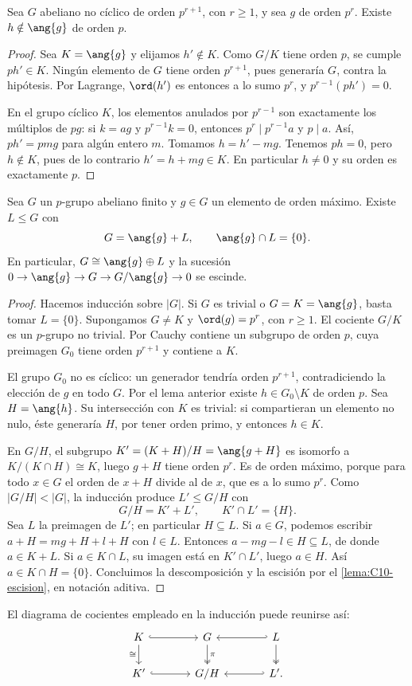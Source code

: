 \begin{lema}\label{lema:C10-auxiliar}
Sea $G$ abeliano no cíclico de orden $p^{r+1}$, con $r\ge1$, y sea $g$ de orden $p^r$. Existe $h\notin\ang{g}$ de orden $p$.
\end{lema}
\begin{proof}
Sea $K=\ang{g}$ y elijamos $h'\notin K$. Como $G/K$ tiene orden $p$, se cumple $ph'\in K$. Ningún elemento de $G$ tiene orden $p^{r+1}$, pues generaría $G$, contra la hipótesis. Por Lagrange, $\ord(h')$ es entonces a lo sumo $p^r$, y $p^{r-1}(ph')=0$.

En el grupo cíclico $K$, los elementos anulados por $p^{r-1}$ son exactamente los múltiplos de $pg$: si $k=ag$ y $p^{r-1}k=0$, entonces $p^r\mid p^{r-1}a$ y $p\mid a$. Así, $ph'=pmg$ para algún entero $m$. Tomamos $h=h'-mg$. Tenemos $ph=0$, pero $h\notin K$, pues de lo contrario $h'=h+mg\in K$. En particular $h\ne0$ y su orden es exactamente $p$.
\end{proof}

\begin{lema}\label{lema:C10-factor-maximo}
Sea $G$ un $p$-grupo abeliano finito y $g\in G$ un elemento de orden máximo. Existe $L\le G$ con
\[
G=\ang{g}+L,\qquad \ang{g}\cap L=\{0\}.
\]
En particular, $G\cong\ang{g}\oplus L$ y la sucesión $0\to\ang{g}\to G\to G/\ang{g}\to0$ se escinde.
\end{lema}
\begin{proof}
Hacemos inducción sobre $|G|$. Si $G$ es trivial o $G=K=\ang{g}$, basta tomar $L=\{0\}$. Supongamos $G\ne K$ y $\ord(g)=p^r$, con $r\ge1$. El cociente $G/K$ es un $p$-grupo no trivial. Por Cauchy contiene un subgrupo de orden $p$, cuya preimagen $G_0$ tiene orden $p^{r+1}$ y contiene a $K$.

El grupo $G_0$ no es cíclico: un generador tendría orden $p^{r+1}$, contradiciendo la elección de $g$ en todo $G$. Por el lema anterior existe $h\in G_0\setminus K$ de orden $p$. Sea $H=\ang{h}$. Su intersección con $K$ es trivial: si compartieran un elemento no nulo, éste generaría $H$, por tener orden primo, y entonces $h\in K$.

En $G/H$, el subgrupo $K'=(K+H)/H=\ang{g+H}$ es isomorfo a $K/(K\cap H)\cong K$, luego $g+H$ tiene orden $p^r$. Es de orden máximo, porque para todo $x\in G$ el orden de $x+H$ divide al de $x$, que es a lo sumo $p^r$. Como $|G/H|<|G|$, la inducción produce $L'\le G/H$ con
\[
G/H=K'+L',\qquad K'\cap L'=\{H\}.
\]
Sea $L$ la preimagen de $L'$; en particular $H\subseteq L$. Si $a\in G$, podemos escribir $a+H=mg+H+l+H$ con $l\in L$. Entonces $a-mg-l\in H\subseteq L$, de donde $a\in K+L$. Si $a\in K\cap L$, su imagen está en $K'\cap L'$, luego $a\in H$. Así $a\in K\cap H=\{0\}$. Concluimos la descomposición y la escisión por el \cref{lema:C10-escision}, en notación aditiva.
\end{proof}
El diagrama de cocientes empleado en la inducción puede reunirse así:
\[
\begin{tikzcd}[column sep=large]
K \arrow[r,hook] \arrow[d,"\cong"'] & G \arrow[d,two heads,"\pi"] & L \arrow[l,hook'] \arrow[d,two heads] \\
K' \arrow[r,hook] & G/H & L' \arrow[l,hook'].
\end{tikzcd}
\]

